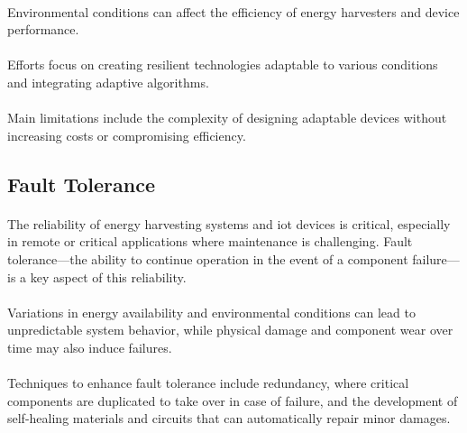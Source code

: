         \paragraph{}
        Environmental conditions can affect the efficiency of energy harvesters and device performance.
        
        \paragraph{}
        Efforts focus on creating resilient technologies adaptable to various conditions and integrating adaptive algorithms.
        
        \paragraph{}
        Main limitations include the complexity of designing adaptable devices without increasing costs or compromising efficiency.

    \subsection{Fault Tolerance}
    
        \paragraph{}
        The reliability of energy harvesting systems and \gls{iot} devices is critical, especially in remote or critical applications where maintenance is challenging. Fault tolerance—the ability to continue operation in the event of a component failure—is a key aspect of this reliability.
        
        \paragraph{}
        Variations in energy availability and environmental conditions can lead to unpredictable system behavior, while physical damage and component wear over time may also induce failures\cite{LIU2023113436}.
        
        \paragraph{}
        Techniques to enhance fault tolerance include redundancy, where critical components are duplicated to take over in case of failure, and the development of self-healing materials and circuits that can automatically repair minor damages.
        
